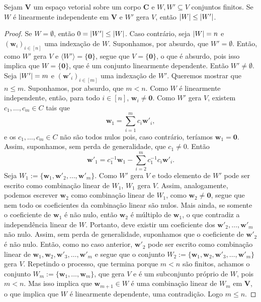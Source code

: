 \begin{proposition}
	Sejam $\bm V$ um espaço vetorial sobre um corpo $\bm C$ e $W,W' \subseteq V$ conjuntos finitos. Se $W$ é linearmente independente em $\bm V$ e $W'$ gera $V$, então $\left\lvert{W}\right\rvert \leq \left\lvert{W'}\right\rvert$.
\end{proposition}
\begin{proof}
	Se $W=\emptyset$, então $0 = \left\lvert{W'}\right\rvert \leq \left\lvert{W}\right\rvert$. Caso contrário, seja $\left\lvert{W}\right\rvert = n$ e $(\bm w_i)_{i \in [n]}$ uma indexação de $W$. Suponhamos, por absurdo, que $W' = \emptyset$. Então, como $W'$ gera $V$ e $\langle W' \rangle = \{\bm 0\}$, segue que $V=\{\bm 0\}$, o que é absurdo, pois isso implica que $W=\{\bm 0\}$, que é um conjunto linearmente dependente. Então $W' \neq \emptyset$.  Seja $\left\lvert{W'}\right\rvert = m$ e $(\bm w'_i)_{i \in [m]}$ uma indexação de $W'$. Queremos mostrar que $n \leq m$. Suponhamos, por absurdo, que $m < n$. Como $W$ é linearmente independente, então, para todo $i \in [n]$, $\bm w_i \neq \bm 0$. Como $W'$ gera $V$, existem $c_1,\ldots,c_m \in C$ tais que
	\begin{equation*}
	\bm w_1 = \sum_{i=1}^m c_i \bm w'_i,
	\end{equation*}
e os $c_1,\ldots,c_m \in C$  não são todos nulos pois, caso contrário, teríamos $\bm w_1=\bm 0$. Assim, suponhamos,  sem perda de generalidade, que $c_1 \neq 0$. Então
	\begin{equation*}
	\bm w'_1 = c_1^{-1}\bm w_1 - \sum_{i=2}^m c_1^{-1}c_i \bm w'_i.
	\end{equation*}
Seja $W_1 := \{\bm w_1,\bm w'_2,\ldots,\bm w'_m\}$. Como $W'$ gera $V$ e todo elemento de $W'$ pode ser escrito como combinação linear de $W_1$, $W_1$ gera $V$. Assim, analogamente, podemos escrever $\bm w_2$ como combinação linear de $W_1$, como $\bm w_2 \neq \bm 0$, segue que nem todo os coeficientes da combinação linear são nulos. Mais ainda, se somente o coeficiente de $\bm w_1$ é não nulo, então $\bm w_2$ é múltiplo de $\bm w_1$, o que contradiz a independência linear de $W$. Portanto, deve existir um coeficiente dos $\bm w'_2,\ldots,\bm w'_m$ não nulo. Assim, sem perda de generalidade, suponhamos que o coeficiente de $\bm w'_2$ é não nulo. Então, como no caso anterior, $\bm w'_2$ pode ser escrito como combinação linear de $\bm w_1, \bm w_2, \bm w'_3,\ldots, \bm w'_m$ e segue que o conjunto $W_2 := \{\bm w_1, \bm w_2, \bm w'_3,\ldots, \bm w'_m\}$ gera $V$. Repetindo o processo, que termina porque $m<n$ são finitos, achamos o conjunto $W_m := \{\bm w_1, \ldots, \bm w_m\}$, que gera $V$ e é um subconjunto próprio de $W$, pois $m < n$. Mas isso implica que $\bm w_{m+1} \in W$ é uma combinação linear de $W_m$ em $\bm V$, o que implica que $W$ é linearmente dependente, uma contradição. Logo $m \leq n$.
\end{proof}

